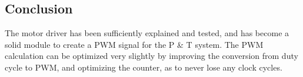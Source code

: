 \subsection{Conclusion}

The motor driver has been sufficiently explained and tested, and has become a solid module to create a PWM signal for the P \& T system. The PWM calculation can be optimized very slightly by improving the conversion from duty cycle to PWM, and optimizing the counter, as to never lose any clock cycles.





































